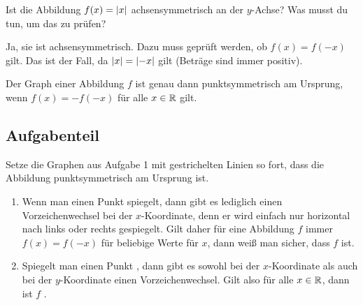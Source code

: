 \documentclass[]{uebungsblatt}
\begin{document}
\begin{exercise}
    Ist die Abbildung $f(x)=\lvert x\rvert$ achsensymmetrisch an der $y$-Achse? Was musst du tun, um das zu prüfen?
    \begin{answerbox}[.5in]
        Ja, sie ist achsensymmetrisch. Dazu muss geprüft werden, ob $f(x)=f(-x)$ gilt. Das ist der Fall, da $\lvert x\rvert=\lvert-x\rvert$ gilt (Beträge sind immer positiv).
    \end{answerbox}
\end{exercise}
\newpage
\begin{theorem}
    Der Graph einer Abbildung $f$ ist genau dann punktsymmetrisch am Ursprung, wenn $f(x)=-f(-x)$ für alle $x\in\mathbb{R}$ gilt.
\end{theorem}
\subsection*{Aufgabenteil}
\begin{exercise}
    Setze die Graphen aus Aufgabe 1 mit gestrichelten Linien so fort, dass die Abbildung punktsymmetrisch am Ursprung ist.
\end{exercise}
\begin{exercise}
    \begin{enumerate}[label=\alph*)]
        \item Wenn man einen Punkt  spiegelt, dann gibt es lediglich einen Vorzeichenwechsel bei der $x$-Koordinate, denn er wird einfach nur horizontal nach links oder rechts gespiegelt. Gilt daher für eine Abbildung $f$ immer $f(x)=f(-x)$ für beliebige Werte für $x$, dann weiß man sicher, dass $f$  ist.
        \item Spiegelt man einen Punkt , dann gibt es sowohl bei der $x$-Koordinate als auch bei der $y$-Koordinate einen Vorzeichenwechsel. Gilt also  für alle $x\in\mathbb{R}$, dann ist $f$  .
    \end{enumerate}
\end{exercise}
\end{document}
